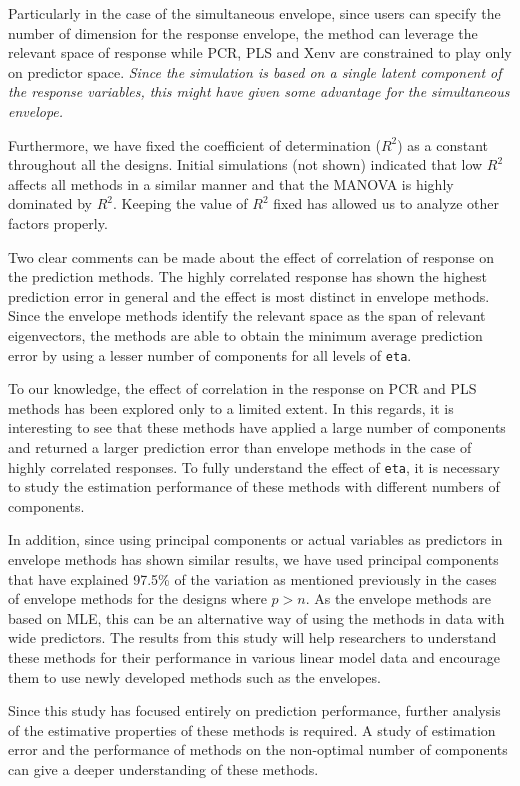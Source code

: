 \documentclass[review]{elsarticle}
\begin{document}
Particularly in the case of the simultaneous envelope, since users can
specify the number of dimension for the response envelope, the method
can leverage the relevant space of response while PCR, PLS and Xenv are
constrained to play only on predictor space. \emph{Since the simulation
is based on a single latent component of the response variables, this
might have given some advantage for the simultaneous envelope.}

Furthermore, we have fixed the coefficient of determination (\(R^2\)) as
a constant throughout all the designs. Initial simulations (not shown)
indicated that low \(R^2\) affects all methods in a similar manner and
that the MANOVA is highly dominated by \(R^2\). Keeping the value of
\(R^2\) fixed has allowed us to analyze other factors properly.

Two clear comments can be made about the effect of correlation of
response on the prediction methods. The highly correlated response has
shown the highest prediction error in general and the effect is most
distinct in envelope methods. Since the envelope methods identify the
relevant space as the span of relevant eigenvectors, the methods are
able to obtain the minimum average prediction error by using a lesser
number of components for all levels of \texttt{eta}.

To our knowledge, the effect of correlation in the response on PCR and
PLS methods has been explored only to a limited extent. In this regards,
it is interesting to see that these methods have applied a large number
of components and returned a larger prediction error than envelope
methods in the case of highly correlated responses. To fully understand
the effect of \texttt{eta}, it is necessary to study the estimation
performance of these methods with different numbers of components.

In addition, since using principal components or actual variables as
predictors in envelope methods has shown similar results, we have used
principal components that have explained 97.5\% of the variation as
mentioned previously in the cases of envelope methods for the designs
where \(p>n\). As the envelope methods are based on MLE, this can be an
alternative way of using the methods in data with wide predictors. The
results from this study will help researchers to understand these
methods for their performance in various linear model data and encourage
them to use newly developed methods such as the envelopes.

Since this study has focused entirely on prediction performance, further
analysis of the estimative properties of these methods is required. A
study of estimation error and the performance of methods on the
non-optimal number of components can give a deeper understanding of
these methods.
\end{document}
